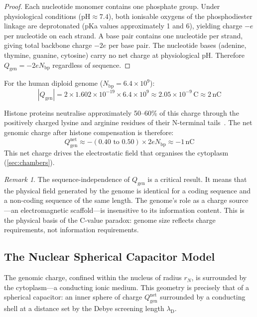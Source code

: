 \documentclass[11pt,twocolumn,a4paper]{article}
\theoremstyle{definition}
\theoremstyle{remark}
\newtheorem{remark}[theorem]{Remark}
\newcommand{\lD}{\lambda_{\mathrm{D}}}
\newcommand{\Qgen}{Q_{\mathrm{gen}}}
\newcommand{\abs}[1]{\left|#1\right|}
\begin{document}
\begin{proof}
Each nucleotide monomer contains one phosphate group. Under physiological conditions ($\mathrm{pH} \approx 7.4$), both ionisable oxygens of the phosphodiester linkage are deprotonated (pKa values approximately 1 and 6), yielding charge $-e$ per nucleotide on each strand. A base pair contains one nucleotide per strand, giving total backbone charge $-2e$ per base pair. The nucleotide bases (adenine, thymine, guanine, cytosine) carry no net charge at physiological pH. Therefore $\Qgen = -2e N_{\mathrm{bp}}$ regardless of sequence.
\end{proof}

For the human diploid genome ($N_{\mathrm{bp}} = 6.4 \times 10^9$):
\begin{equation}
  \abs{\Qgen} = 2 \times 1.602 \times 10^{-19} \times 6.4 \times 10^9 \approx 2.05 \times 10^{-9}\,\mathrm{C} \approx 2\,\mathrm{nC}
\end{equation}

Histone proteins neutralise approximately 50--60\% of this charge through the positively charged lysine and arginine residues of their N-terminal tails~\cite{Luger1997,Hansen2002}. The net genomic charge after histone compensation is therefore:
\begin{equation}
  \Qgen^{\mathrm{net}} \approx -(0.40\text{ to }0.50) \times 2e N_{\mathrm{bp}} \approx -1\,\mathrm{nC}
  \label{eq:net_genome_charge}
\end{equation}
This net charge drives the electrostatic field that organises the cytoplasm (\cref{sec:chambers}).

\begin{remark}
The sequence-independence of $\Qgen$ is a critical result. It means that the physical field generated by the genome is identical for a coding sequence and a non-coding sequence of the same length. The genome's role as a charge source---an electromagnetic scaffold---is insensitive to its information content. This is the physical basis of the C-value paradox: genome size reflects charge requirements, not information requirements.
\end{remark}

\subsection{The Nuclear Spherical Capacitor Model}

The genomic charge, confined within the nucleus of radius $r_N$, is surrounded by the cytoplasm---a conducting ionic medium. This geometry is precisely that of a spherical capacitor: an inner sphere of charge $\Qgen^{\mathrm{net}}$ surrounded by a conducting shell at a distance set by the Debye screening length $\lD$.
\end{document}

